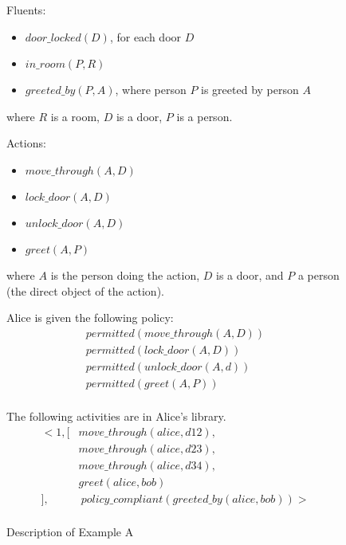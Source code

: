 \begin{figure}[h]
    \begin{framed}
        Fluents:
        \begin{itemize}
            \item $door\_locked(D)$, for each door $D$
            \item $in\_room(P, R)$
            \item $greeted\_by(P, A)$, where person $P$ is greeted by person $A$
        \end{itemize}
        where $R$ is a room, $D$ is a door, $P$ is a person.

        Actions:
        \begin{itemize}
            \item $move\_through(A, D)$
            \item $lock\_door(A, D)$
            \item $unlock\_door(A, D)$
            \item $greet(A, P)$
        \end{itemize}
        where $A$ is the person doing the action, $D$ is a door, and $P$ a person (the direct object of the action).

        Alice is given the following policy:
        \begin{gather}
            \label{eq:apia_example_a_permitted_move_through}
            permitted(move\_through(A, D)) \\
            permitted(lock\_door(A, D)) \\
            permitted(unlock\_door(A, d)) \\
            permitted(greet(A, P)) \\
        \end{gather}

        The following activities are in Alice's library.
        \begin{equation}
        \begin{split}
            <1, [
                & move\_through(alice, d12), \\
                & move\_through(alice, d23), \\
                & move\_through(alice, d34), \\
                & greet(alice, bob) \\
            ], & \ policy\_compliant(greeted\_by(alice, bob))> \\
        \end{split}
        \end{equation}
    \end{framed}
    \caption{Description of Example A}
    \label{fig:apia_example_a_description}
\end{figure}

